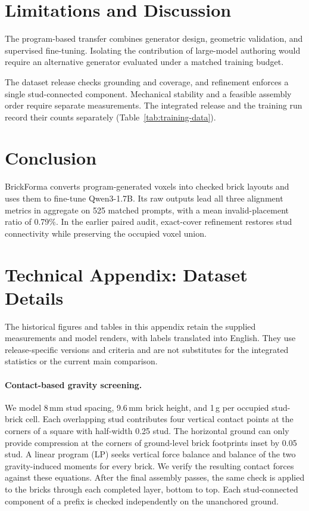 \documentclass[letterpaper]{article} %
\begin{document}
\section{Limitations and Discussion}
The program-based transfer combines generator design, geometric validation, and supervised fine-tuning. Isolating the contribution of large-model authoring would require an alternative generator evaluated under a matched training budget.

The dataset release checks grounding and coverage, and refinement enforces a single stud-connected component. Mechanical stability and a feasible assembly order require separate measurements. The integrated release and the training run record their counts separately (Table~\ref{tab:training-data}).

\section{Conclusion}
BrickForma converts program-generated voxels into checked brick layouts and uses them to fine-tune Qwen3-1.7B. Its raw outputs lead all three alignment metrics in aggregate on 525 matched prompts, with a mean invalid-placement ratio of 0.79\%. In the earlier paired audit, exact-cover refinement restores stud connectivity while preserving the occupied voxel union.


\FloatBarrier
\appendix
\section{Technical Appendix: Dataset Details}
\label{app:dataset}
The historical figures and tables in this appendix retain the supplied measurements and model renders, with labels translated into English. They use release-specific versions and criteria and are not substitutes for the integrated statistics or the current main comparison.

\paragraph{Contact-based gravity screening.}
We model 8\,mm stud spacing, 9.6\,mm brick height, and 1\,g per occupied stud-brick cell. Each overlapping stud contributes four vertical contact points at the corners of a square with half-width 0.25 stud. The horizontal ground can only provide compression at the corners of ground-level brick footprints inset by 0.05 stud. A linear program (LP) seeks vertical force balance and balance of the two gravity-induced moments for every brick. We verify the resulting contact forces against these equations. After the final assembly passes, the same check is applied to the bricks through each completed layer, bottom to top. Each stud-connected component of a prefix is checked independently on the unanchored ground.
\end{document}
